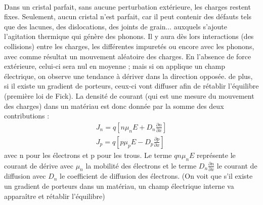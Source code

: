 \paragraph*{}
Dans un cristal parfait, sans aucune perturbation extérieure, les charges restent fixes. Seulement, aucun cristal n'est parfait, car il peut contenir des défauts tels que des lacunes, des dislocations, des joints de grain... auxquels s'ajoute l'agitation thermique qui génère des phonons. Il y aura dès lors interactions (des collisions) entre les charges, les différentes impuretés ou encore avec les phonons, avec comme résultat un mouvement aléatoire des charges. En l'absence de force extérieure, celui-ci sera nul en moyenne ; mais si on applique un champ électrique, on observe une tendance à dériver dans la direction opposée. de plus, si il existe un gradient de porteurs, ceux-ci vont diffuser afin de rétablir l'équilibre (première loi de Fick).
La densité de courant (qui est une mesure du mouvement des charges) dans un matériau est donc donnée par la somme des deux contributions :
\begin{equation}
\begin{array}{c}
J_n=q[n\mu_nE+D_n \frac{\partial n}{\partial x }]
\\ 
J_p=q[p\mu_pE-D_p \frac{\partial p}{\partial x }]
\end{array} 
\end{equation}
avec n pour les électrons et p pour les trous. Le terme $qn\mu_nE$ représente le courant de dérive avec $\mu_n$ la mobilité des électrons et le terme $D_n \frac{\partial n}{\partial x }$ le courant de diffusion avec $D_n$ le coefficient de diffusion des électrons. (On voit que s'il existe un gradient de porteurs dans un matériau, un champ électrique interne va apparaître et rétablir l'équilibre) %


